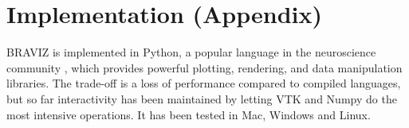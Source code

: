 \documentclass[twocolumn]{svjour3} %
\begin{document}
%
%
%






\section*{Implementation (Appendix)}

BRAVIZ is implemented in Python, a popular language in the neuroscience community \cite{gorgolewski_nipype:_2011}\cite{garyfallidis_dipy_2014}, which provides powerful plotting, rendering, and data manipulation libraries. The trade-off is a loss of performance compared to compiled languages, but so far interactivity has been maintained by letting VTK\cite{schroeder_vtk_1998} and Numpy\cite{van_der_walt_numpy_2011} do the most intensive operations. It has been tested in Mac, Windows and Linux.
\end{document}
